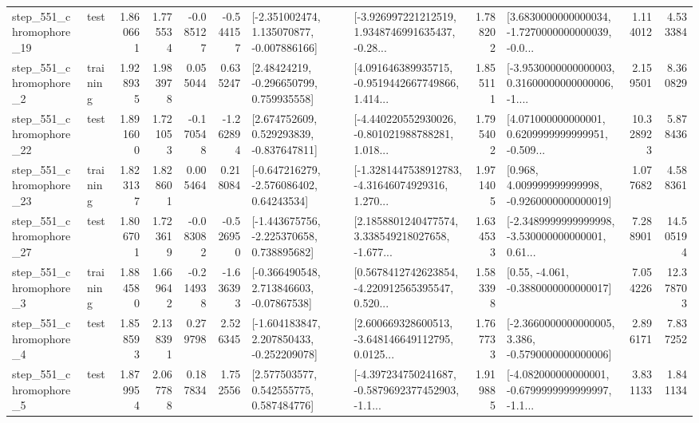 \begin{tabular}{llrrrrllrlrr}
  step\_551\_chromophore\_19 &      test &      1.860661 &    1.775534 &     -0.085127 & -0.544157 &   [-2.351002474, 1.135070877, -0.007886166] &  [-3.926997221212519, 1.9348746991635437, -0.28... &       1.788202 &  [3.6830000000000034, -1.7270000000000039, -0.0... &            1.114012 &          4.533384 \\
   step\_551\_chromophore\_2 &  training &      1.928935 &    1.983978 &      0.055044 &  0.635247 &     [2.48424219, -0.296650799, 0.759935558] &  [4.091646389935715, -0.9519442667749866, 1.414... &       1.855111 &  [-3.9530000000000003, 0.31600000000000006, -1.... &            2.159501 &          8.360829 \\
  step\_551\_chromophore\_22 &      test &      1.891600 &    1.721053 &     -0.170548 & -1.262894 &    [2.674752609, 0.529293839, -0.837647811] &  [-4.440220552930026, -0.801021988788281, 1.018... &       1.795402 &  [4.071000000000001, 0.6209999999999951, -0.509... &           10.328923 &          5.878436 \\
  step\_551\_chromophore\_23 &  training &      1.823137 &    1.828601 &      0.005464 &  0.218084 &    [-0.647216279, -2.576086402, 0.64243534] &  [-1.3281447538912783, -4.31646074929316, 1.270... &       1.971405 &    [0.968, 4.009999999999998, -0.9260000000000019] &            1.077682 &          4.588361 \\
  step\_551\_chromophore\_27 &      test &      1.806701 &    1.723619 &     -0.083082 & -0.526950 &   [-1.443675756, -2.225370658, 0.738895682] &  [2.1858801240477574, 3.338549218027658, -1.677... &       1.634533 &  [-2.3489999999999998, -3.530000000000001, 0.61... &            7.288901 &         14.505194 \\
   step\_551\_chromophore\_3 &  training &      1.884580 &    1.669642 &     -0.214938 & -1.636393 &    [-0.366490548, 2.713846603, -0.07867538] &  [0.5678412742623854, -4.220912565395547, 0.520... &       1.583398 &                [0.55, -4.061, -0.3880000000000017] &            7.054226 &         12.378703 \\
   step\_551\_chromophore\_4 &      test &      1.858593 &    2.138391 &      0.279798 &  2.526345 &   [-1.604183847, 2.207850433, -0.252209078] &  [2.600669328600513, -3.648146649112795, 0.0125... &       1.767733 &  [-2.3660000000000005, 3.386, -0.5790000000000006] &            2.896171 &          7.837252 \\
   step\_551\_chromophore\_5 &      test &      1.879954 &    2.067788 &      0.187834 &  1.752556 &     [2.577503577, 0.542555775, 0.587484776] &  [-4.397234750241687, -0.5879692377452903, -1.1... &       1.919885 &  [-4.082000000000001, -0.6799999999999997, -1.1... &            3.831133 &          1.841134 \\

\end{tabular}
